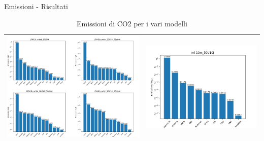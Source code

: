 \begin{frame}{Emissioni - Risultati}
    \begin{table}[H]
        \centering
        \footnotesize
        \setlength\tabcolsep{0pt}
        \begin{tabularx}{\textwidth}{|X|X|}
            \hline
            \includegraphics[width=\linewidth, trim=0 0 0 0]{images/EmissioniLFM.png} & 
            \includegraphics[width=\linewidth, trim=0 0 0 0]{images/emissions_ml-10m_50U10I.png} \\
            \hline
        \end{tabularx}
        \caption{Emissioni di CO2 per i vari modelli}
    \end{table}
\end{frame}


